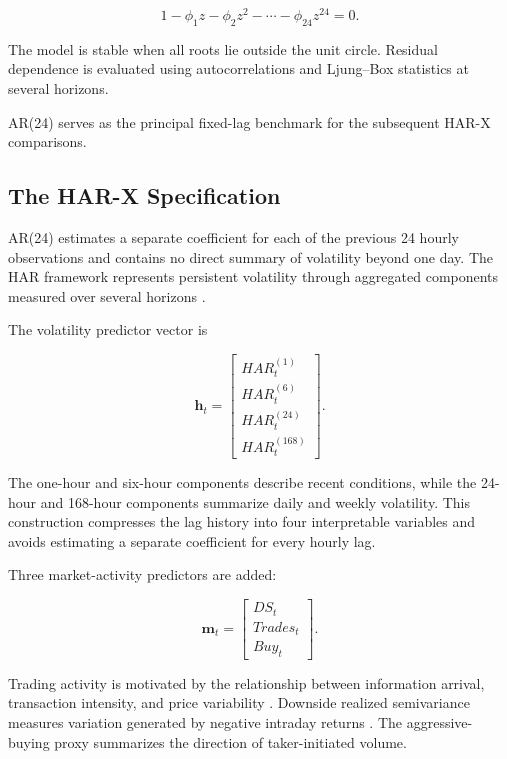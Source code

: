 \begin{equation}
1
-
\phi_1 z
-
\phi_2 z^2
-
\cdots
-
\phi_{24} z^{24}
=
0.
\label{eq:ar-characteristic-polynomial}
\end{equation}

The model is stable when all roots lie outside the unit circle.
Residual dependence is evaluated using autocorrelations and
Ljung--Box statistics at several horizons.

AR(24) serves as the principal fixed-lag benchmark for the
subsequent HAR-X comparisons.

\subsection{The HAR-X Specification}

AR(24) estimates a separate coefficient for each of the
previous 24 hourly observations and contains no direct summary
of volatility beyond one day. The HAR framework represents
persistent volatility through aggregated components measured
over several horizons \citep{corsi2009}.

The volatility predictor vector is

\[
\mathbf{h}_t
=
\begin{bmatrix}
HAR^{(1)}_t \\
HAR^{(6)}_t \\
HAR^{(24)}_t \\
HAR^{(168)}_t
\end{bmatrix}.
\]

The one-hour and six-hour components describe recent
conditions, while the 24-hour and 168-hour components summarize
daily and weekly volatility. This construction compresses the
lag history into four interpretable variables and avoids
estimating a separate coefficient for every hourly lag.

Three market-activity predictors are added:

\[
\mathbf{m}_t
=
\begin{bmatrix}
DS_t \\
Trades_t \\
Buy_t
\end{bmatrix}.
\]

Trading activity is motivated by the relationship between
information arrival, transaction intensity, and price
variability \citep{clark1973,jones1994}. Downside realized
semivariance measures variation generated by negative
intraday returns \citep{barndorffnielsen2010}. The
aggressive-buying proxy summarizes the direction of
taker-initiated volume.

